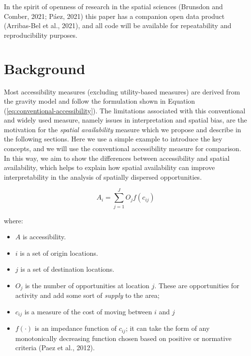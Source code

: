 \documentclass[]{elsarticle} %
\providecommand{\tightlist}{%
  \setlength{\itemsep}{0pt}\setlength{\parskip}{0pt}}
\begin{document}
In the spirit of openness of research in the spatial sciences (Brunsdon
and Comber, 2021; Páez, 2021) this paper has a companion open data
product (Arribas-Bel et al., 2021), and all code will be available for
repeatability and reproducibility purposes.

\hypertarget{background}{%
\section{Background}\label{background}}

Most accessibility measures (excluding utility-based measures) are
derived from the gravity model and follow the formulation shown in
Equation (\ref{eq:conventional-accessibility}). The limitations
associated with this conventional and widely used measure, namely issues
in interpretation and spatial bias, are the motivation for the
\emph{spatial availability} measure which we propose and describe in the
following sections. Here we use a simple example to introduce the key
concepts, and we will use the conventional accessibility measure for
comparison. In this way, we aim to show the differences between
accessibility and spatial availability, which helps to explain how
spatial availability can improve interpretability in the analysis of
spatially dispersed opportunities.

\begin{equation}
\label{eq:conventional-accessibility}
A_i = \sum_{j=1}^JO_jf(c_{ij})
\end{equation}

\noindent where:

\begin{itemize}
\tightlist
\item
  \(A\) is accessibility.
\item
  \(i\) is a set of origin locations.
\item
  \(j\) is a set of destination locations.
\item
  \(O_j\) is the number of opportunities at location \(j\). These are
  opportunities for activity and add some sort of \emph{supply} to the
  area;
\item
  \(c_{ij}\) is a measure of the cost of moving between \(i\) and \(j\)
\item
  \(f(\cdot)\) is an impedance function of \(c_{ij}\); it can take the
  form of any monotonically decreasing function chosen based on positive
  or normative criteria (Paez et al., 2012).
\end{itemize}
\end{document}
